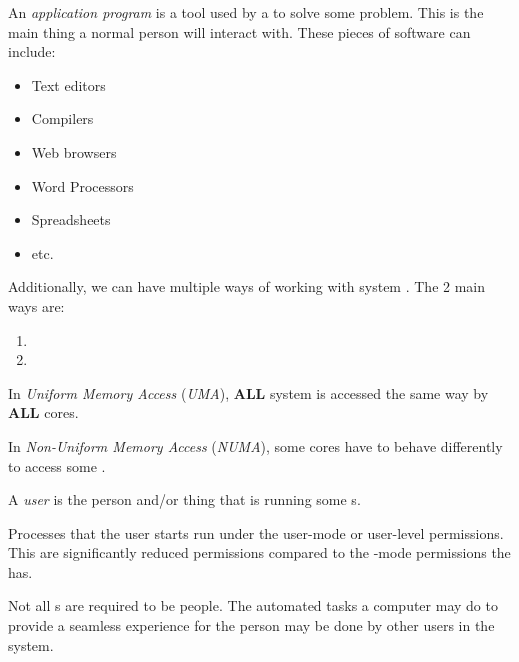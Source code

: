 \begin{definition}\label{def:Application_Program}
  An \emph{application program} is a tool used by a  to solve some problem.
  This is the main thing a normal person will interact with.
  These pieces of software can include:
  \begin{itemize}[noitemsep]
  \item Text editors
  \item Compilers
  \item Web browsers
  \item Word Processors
  \item Spreadsheets
  \item etc.
  \end{itemize}
\end{definition}

Additionally, we can have multiple ways of working with system .
The 2 main ways are:
\begin{enumerate}[noitemsep]
\item {}
\item {}
\end{enumerate}

\begin{definition}\label{def:Uniform_Memory_Access}
  In \emph{Uniform Memory Access} (\emph{UMA}), \textbf{ALL} system  is accessed the same way by \textbf{ALL} cores.
\end{definition}

\begin{definition}\label{def:Non_Uniform_Memory_Access}
  In \emph{Non-Uniform Memory Access} (\emph{NUMA}), some cores have to behave differently to access some .
\end{definition}

\begin{definition}[User]\label{def:User}
  A \emph{user} is the person and/or thing that is running some s.

  Processes that the user starts run under the user-mode or user-level permissions.
  This are significantly reduced permissions compared to the -mode permissions the  has.

  \begin{remark}\label{rmk:Thing_Users}
    Not all s are required to be people.
    The automated tasks a computer may do to provide a seamless experience for the person may be done by other users in the system.
  \end{remark}
\end{definition}

